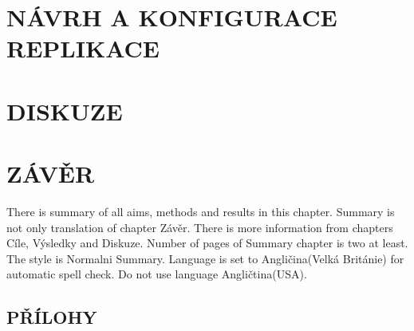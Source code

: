 \documentclass{thesisKGI}
\begin{document}
    \newpage
    \section{NÁVRH A KONFIGURACE REPLIKACE}
      
      
      
      

    \newpage
    \section{DISKUZE}

    \newpage
    \section{ZÁVĚR}



    \begin{summary}
      There is summary of all aims, methods and results in this chapter.
      Summary is not only translation of chapter Závěr. There is more
      information from chapters Cíle, Výsledky and Diskuze. Number of
      pages of Summary chapter is two at least. The style is Normalni
      Summary. Language is set to Angličina(Velká Británie) for automatic
      spell check. Do not use language Angličtina(USA). 
    \end{summary}

    \newpage
    \vspace*{180pt}
    \begin{center}
    \section*{PŘÍLOHY}
    \end{center}
    \vspace*{\fill}
\end{document}
